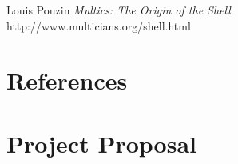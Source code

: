 \documentclass[12pt,twoside,notitlepage]{report}
\begin{document}

\cleardoublepage


\begin{thebibliography}{1} %

  Louis Pouzin
  \emph{Multics: The Origin of the Shell}
  http://www.multicians.org/shell.html

\end{thebibliography}
\cleardoublepage

\appendix

\chapter{References}

\chapter{Project Proposal}
\parindent 0pt
\parskip 6pt

\end{document}
